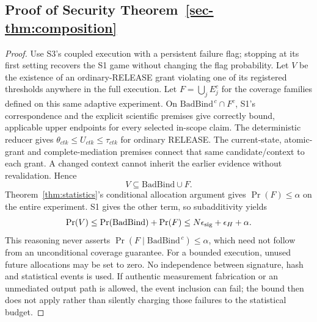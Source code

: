 \subsection{Proof of Security Theorem~\ref{sec-thm:composition}}
\begin{proof}
Use S3's coupled execution with a persistent failure flag; stopping at its
first setting recovers the S1 game without changing the flag probability.
Let $V$ be the existence of an ordinary-RELEASE grant violating one of its
registered thresholds anywhere in the full execution. Let $F=\bigcup_j E_j^c$ for the coverage families
defined on this same adaptive experiment. On
$\mathrm{BadBind}^{\,c}\cap F^c$, S1's correspondence and the explicit
scientific premises give correctly bound, applicable upper endpoints for
every selected in-scope claim. The deterministic reducer gives
$\theta_{ctk}\le U_{ctk}\le\tau_{ctk}$ for ordinary RELEASE.
The current-state, atomic-grant and complete-mediation premises connect
that same candidate/context to each grant. A changed context cannot
inherit the earlier evidence without revalidation. Hence
\[
 V\subseteq\mathrm{BadBind}\cup F.
\]
Theorem~\ref{thm:statistics}'s conditional allocation argument gives
$\Pr(F)\le\alpha$ on the entire experiment. S1 gives the other term, so
subadditivity yields
\[
 \Pr(V)\le\Pr(\mathrm{BadBind})+\Pr(F)
       \le N\epsilon_{\rm sig}+\epsilon_H+\alpha.
\]
This reasoning never asserts
$\Pr(F\mid\mathrm{BadBind}^{\,c})\le\alpha$, which need not follow from
an unconditional coverage guarantee. For a bounded execution, unused
future allocations may be set to zero. No independence between signature,
hash and statistical events is used. If authentic measurement fabrication
or an unmediated output path is allowed, the event inclusion can fail;
the bound then does not apply rather than silently charging those failures
to the statistical budget.
\end{proof}

